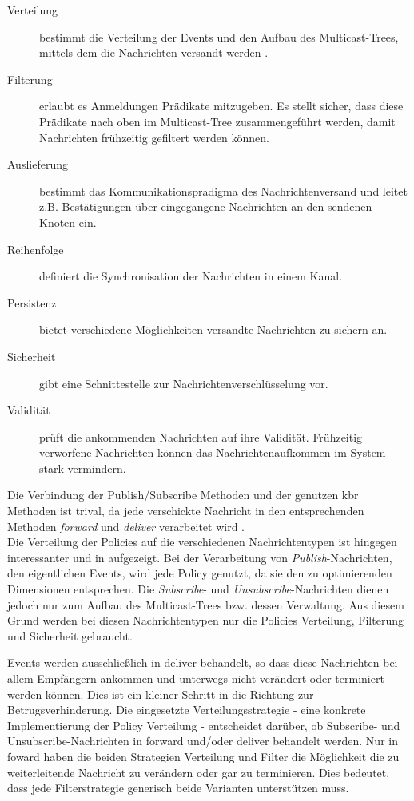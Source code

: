 \begin{description}
\item[Verteilung] bestimmt die Verteilung der Events und den Aufbau des Multicast-Trees, mittels dem die Nachrichten versandt werden \cite{KostasKatrinis2005}.
\item[Filterung] erlaubt es Anmeldungen Prädikate mitzugeben. Es stellt sicher, dass diese Prädikate nach oben im Multicast-Tree zusammengeführt werden, damit Nachrichten frühzeitig gefiltert werden können.
\item[Auslieferung] bestimmt das Kommunikationspradigma des Nachrichtenversand und leitet z.B. Bestätigungen über eingegangene Nachrichten an den sendenen Knoten ein.
\item[Reihenfolge] definiert die Synchronisation der Nachrichten in einem Kanal.
\item[Persistenz] bietet verschiedene Möglichkeiten versandte Nachrichten zu sichern an.
\item[Sicherheit] gibt eine Schnittestelle zur Nachrichtenverschlüsselung vor.
\item[Validität] prüft die ankommenden Nachrichten auf ihre Validität. Frühzeitig verworfene Nachrichten können das Nachrichtenaufkommen im System stark vermindern.
\end{description}

Die Verbindung der Publish/Subscribe Methoden und der genutzen \ac{kbr} Methoden ist trival, da jede verschickte Nachricht in den entsprechenden Methoden \emph{forward} und \emph{deliver} verarbeitet wird \cite{Dabek2003Towards}.\\
Die Verteilung der Policies auf die verschiedenen Nachrichtentypen ist hingegen interessanter und in  aufgezeigt. Bei der Verarbeitung von \emph{Publish}-Nachrichten, den eigentlichen Events, wird jede Policy genutzt, da sie den zu optimierenden Dimensionen entsprechen. Die \emph{Subscribe}- und \emph{Unsubscribe}-Nachrichten dienen jedoch nur zum Aufbau des Multicast-Trees bzw. dessen Verwaltung. Aus diesem Grund werden bei diesen Nachrichtentypen nur die Policies Verteilung, Filterung und Sicherheit gebraucht.

Events werden ausschließlich in deliver behandelt, so dass diese Nachrichten bei allem Empfängern ankommen und unterwegs nicht verändert oder terminiert werden können. Dies ist ein kleiner Schritt in die Richtung zur Betrugsverhinderung. Die eingesetzte Verteilungsstrategie - eine konkrete Implementierung der Policy Verteilung - entscheidet darüber, ob Subscribe- und Unsubscribe-Nachrichten in forward und/oder deliver behandelt werden. Nur in foward haben die beiden Strategien Verteilung und Filter die Möglichkeit die zu weiterleitende Nachricht zu verändern oder gar zu terminieren. Dies bedeutet, dass jede Filterstrategie generisch beide Varianten unterstützen muss.

